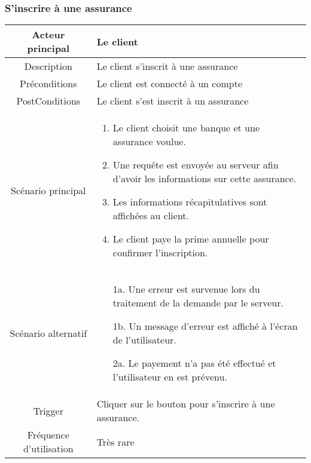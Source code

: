 \documentclass{article}
\begin{document}
\subsubsection{S'inscrire à une assurance}
\begin{table}[h]
    \begin{tabular}{|c|p{10cm}|}
       \hline
       Acteur principal&Le client\\
       \hline
       Description&Le client s'inscrit à une assurance\\
       \hline
       Préconditions&Le client est connecté à un compte\\
       \hline
       PostConditions&Le client s'est inscrit à un assurance\\
       \hline
       Scénario principal& 
             \begin{enumerate}
                \item Le client choisit une banque et une assurance voulue.
                \item Une requête est envoyée au serveur afin d'avoir les informations sur cette assurance.
                \item Les informations récapitulatives sont affichées au client.
                \item Le client paye la prime annuelle pour confirmer l'inscription.
             \end{enumerate}     \\
       \hline
       Scénario alternatif& 
       \begin{itemize}
        \item[1a.] Une erreur est survenue lors du traitement de la demande par le serveur.
        \item[1b.] Un message d'erreur est affiché à l'écran de l'utilisateur. 
        \item[2a.] Le payement n'a pas été effectué et l'utilisateur en est prévenu.
    \end{itemize}
         \\
       \hline
       Trigger&Cliquer sur le bouton pour s'inscrire à une assurance.\\
       \hline
       Fréquence d'utilisation&Très rare\\
       \hline
    \end{tabular}
 \end{table}


\newpage

\end{document}

